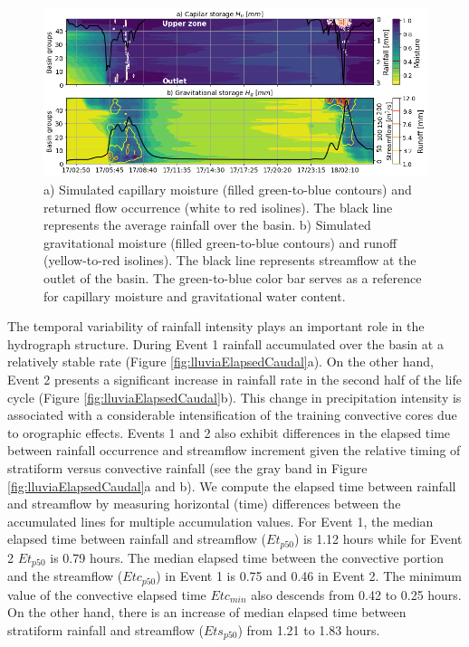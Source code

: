 \documentclass[hess, manuscript]{copernicus}
\begin{document}
\begin{figure}[t!]
\centering
 \includegraphics[width=15cm]{Figures/Evolucion_humedad.png}
 \caption{ a) Simulated capillary moisture (filled green-to-blue contours) and returned flow occurrence (white to red isolines).  The black line represents the average rainfall over the basin. b) Simulated gravitational moisture (filled green-to-blue contours) and runoff (yellow-to-red isolines).  The black line represents streamflow at the outlet of the basin.  The green-to-blue color bar serves as a reference for capillary moisture and gravitational water content.}
    \label{fig:HumedadSpatioTemporal}
\end{figure}

The temporal variability of rainfall intensity plays an important role in the  hydrograph structure. During Event 1 rainfall accumulated over the basin at a relatively stable rate (Figure \ref{fig:lluviaElapsedCaudal}a).  On the other hand, Event 2 presents a significant increase in rainfall rate in the second half of the life cycle (Figure \ref{fig:lluviaElapsedCaudal}b).  This change in precipitation intensity is associated with a considerable intensification of the training convective cores due to orographic effects. Events 1 and 2 also exhibit differences in the elapsed time between rainfall occurrence and streamflow increment given the relative timing of stratiform versus convective rainfall (see the gray band in Figure \ref{fig:lluviaElapsedCaudal}a and b).  We compute the elapsed time between rainfall and streamflow by measuring horizontal (time) differences between the accumulated lines for multiple accumulation values. For Event 1, the median elapsed time between rainfall and streamflow ($Et_{p50}$) is 1.12 hours while for Event 2 $Et_{p50}$ is 0.79 hours.  The median elapsed time between the convective portion and the streamflow ($Etc_{p50}$) in Event 1 is 0.75 and 0.46 in Event 2. The minimum value of the convective elapsed time $Etc_{min}$ also descends from 0.42 to 0.25 hours.  On the other hand, there is an increase of median elapsed time between stratiform rainfall and streamflow ($Ets_{p50}$) from 1.21 to 1.83 hours.\\  
\end{document}
